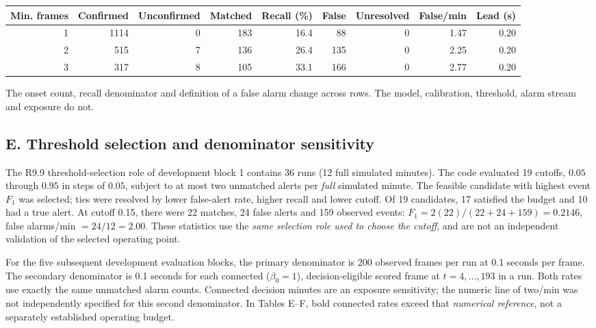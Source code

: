 \documentclass[10pt,a4paper]{article}
\begin{document}
\begin{center}
\small
\setlength{\tabcolsep}{3.8pt}
\begin{adjustbox}{max width=\linewidth}\begin{tabular}{rrrrrrrrr}
\toprule
Min. frames & Confirmed & Unconfirmed & Matched & Recall (\%) & False & Unresolved & False/min & Lead (s) \\
\midrule
1 & 1114 & 0 & 183 & 16.4 & 88 & 0 & 1.47 & 0.20 \\
2 & 515 & 7 & 136 & 26.4 & 135 & 0 & 2.25 & 0.20 \\
3 & 317 & 8 & 105 & 33.1 & 166 & 0 & 2.77 & 0.20 \\
\bottomrule
\end{tabular}\end{adjustbox}
\end{center}

\noindent The onset count, recall denominator and definition of a false alarm change across rows. The model, calibration, threshold, alarm stream and exposure do not.

\newpage
\subsection*{E. Threshold selection and denominator sensitivity}
\noindent The R9.9 threshold-selection role of development block 1 contains 36 runs (12 full simulated minutes). The code evaluated 19 cutoffs, $0.05$ through $0.95$ in steps of $0.05$, subject to at most two unmatched alerts per \emph{full} simulated minute. The feasible candidate with highest event $F_1$ was selected; ties were resolved by lower false-alert rate, higher recall and lower cutoff. Of 19 candidates, 17 satisfied the budget and 10 had a true alert. At cutoff 0.15, there were 22 matches, 24 false alerts and 159 observed events: $F_1=2(22)/(22+24+159)=0.2146$, false alarms/min $=24/12=2.00$. These statistics use the \emph{same selection role used to choose the cutoff}, and are not an independent validation of the selected operating point.

\medskip
\noindent For the five subsequent development evaluation blocks, the primary denominator is 200 observed frames per run at 0.1 seconds per frame. The secondary denominator is 0.1 seconds for each connected ($\beta_0=1$), decision-eligible scored frame at $t=4,\ldots,193$ in a run. Both rates use exactly the same unmatched alarm counts. Connected decision minutes are an exposure sensitivity; the numeric line of two/min was not independently specified for this second denominator. In Tables E--F, bold connected rates exceed that \emph{numerical reference}, not a separately established operating budget.
\end{document}
